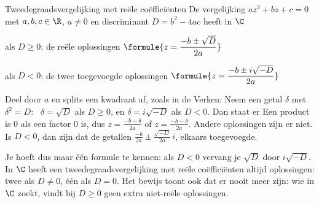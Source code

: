 \begin{theorie}
\begin{stelling}{Tweedegraadsvergelijking met reële coëfficiënten}
De vergelijking $az^2 + bz + c = 0$ met $a, b, c \in \R$, $a \neq 0$ en discriminant $D = b^2 - 4ac$ heeft in $\C$

\vspace{1mm}
als $D \geqslant 0$: de reële oplossingen \quad $\formule{z = \dfrac{-b \pm \sqrt{D}}{2a}}$

\vspace{1mm}
als $D < 0$: de twee toegevoegde oplossingen \quad $\formule{z = \dfrac{-b \pm i\sqrt{-D}}{2a}}$
\end{stelling}

\begin{bewijs}
Deel door $a$ en splits een kwadraat af, zoals in de Verken:
Neem een getal $\delta$ met $\delta^2 = D$: \ $\delta = \sqrt{D}$ als $D \geqslant 0$, en $\delta = i\sqrt{-D}$ als $D < 0$. Dan staat er
Een product is 0 als een factor 0 is, dus $z = \frac{-b + \delta}{2a}$ of $z = \frac{-b - \delta}{2a}$. Andere oplossingen zijn er niet. Is $D < 0$, dan zijn dat de getallen $\frac{-b}{2a} \pm \frac{\sqrt{-D}}{2a}\,i$, elkaars toegevoegde.
\end{bewijs}
\end{theorie}

Je hoeft dus maar één formule te kennen: als $D < 0$ vervang je $\sqrt{D}$ door $i\sqrt{-D}$. In $\C$ heeft een tweedegraadsvergelijking met reële coëfficiënten altijd oplossingen: twee als $D \neq 0$, één als $D = 0$. Het bewijs toont ook dat er nooit meer zijn: wie in $\C$ zoekt, vindt bij $D \geqslant 0$ geen extra niet-reële oplossingen.


